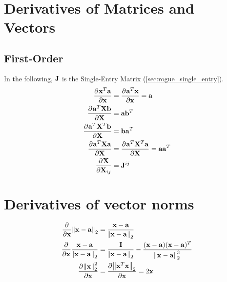 \section{Derivatives of Matrices and Vectors}

\subsection{First-Order}

In the following, $\mathbf{J}$ is the Single-Entry Matrix (\autoref{sec:rogue_single_entry}).
\begin{align}
\pd{\vx^T \va}{\vx}     &= \pd{\va^T \vx}{\vx} = \va          \\
\pd{\va^T\mX\vb}{\mX}   &= \va\vb^T                           \\
\pd{\va^T\mX^T\vb}{\mX} &= \vb\va^T                           \\
\pd{\va^T\mX\va}{\mX}   &= \pd{\va^T\mX^T\va}{\mX} = \va\va^T \\
\pd{\mX}{\mX_{ij}}      &= \mJ^{ij}                              %
\end{align}

\section{Derivatives of vector norms}

\begin{align}
\frac{\partial^{} }{\partial \mathbf{x}}\norm{\mathbf{x}-\mathbf{a}}_2 &= \frac{\mathbf{x}-\mathbf{a}}{\norm{\mathbf{x}-\mathbf{a}}_2} \\
\frac{\partial^{} }{\partial \mathbf{x}}\frac{\mathbf{x}-\mathbf{a}}{\norm{\mathbf{x}-\mathbf{a}}_2} &= \frac{\mathbf{I}}{\norm{\mathbf{x}-\mathbf{a}}_2}-\frac{(\mathbf{x}-\mathbf{a})(\mathbf{x}-\mathbf{a})^T}{\norm{\mathbf{x}-\mathbf{a}}_2^3} \\
\frac{\partial^{} \norm{\mathbf{x}}_2^2}{\partial \mathbf{x}} &= \frac{\partial^{} \norm{\mathbf{x}^T\mathbf{x}}_2}{\partial \mathbf{x}} = 2\mathbf{x}
\end{align}

